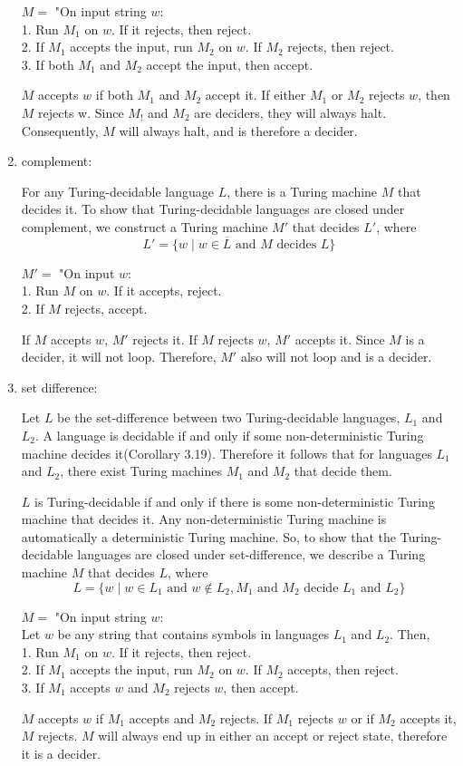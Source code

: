 \documentclass{article}
\begin{document}
\begin{enumerate}[\indent a)]
$M = $ "On input string $w$: 
    \\1. Run $M_1$ on $w$. If it rejects, then reject.
    \\2. If $M_1$ accepts the input, run $M_2$ on $w$. If $M_2$ rejects, then reject.
    \\3. If both $M_1$ and $M_2$ accept the input, then accept.
    
    
    $M$ accepts $w$ if both $M_1$ and $M_2$ accept it. If either $M_1$ or $M_2$ rejects $w$, then $M$ rejects w. Since $M_!$ and $M_2$ are deciders, they will always halt. Consequently, $M$ will always halt, and is therefore a decider.
    
    \item complement:
    
    For any Turing-decidable language $L$, there is a Turing machine $M$ that decides it. To show that Turing-decidable languages are closed under complement, we construct a Turing machine $M'$ that decides $L'$, where
    $$L' = \{w \;|\;  w \in \overline{L} \text{ and $M$ decides $L$}  \}$$
    
    $M' = $ "On input $w$:
    \\1. Run $M$ on $w$. If it accepts, reject.
    \\2. If $M$ rejects, accept.
    
    
    If $M$ accepts $w$, $M'$ rejects it. If $M$ rejects $w$, $M'$ accepts it. Since $M$ is a decider, it will not loop. Therefore, $M'$ also will not loop and is a decider.
    \item set difference:
    
        Let $L$ be the set-difference between two Turing-decidable languages, $L_1$ and $L_2$. A language is decidable if and only if some non-deterministic Turing machine decides it(Corollary 3.19). Therefore it follows that for languages $L_1$ and $L_2$, there exist Turing machines $M_1$ and $M_2$ that decide them.

$L$ is Turing-decidable if and only if there is some non-deterministic Turing machine that decides it. Any non-deterministic Turing machine is automatically a deterministic Turing machine. So, to show that the Turing-decidable languages are closed under set-difference, we describe a Turing machine $M$ that decides $L$, where
$$L = \{w \;|\;  w \in L_1 \text{ and } w\notin L_2, M_1 \text{ and  $M_2$ decide $L_1$ and $L_2$}\}$$

$M = $ "On input string $w$: 
    \\Let $w$ be any string that contains symbols in languages $L_1$ and $L_2$. Then,
    \\1. Run $M_1$ on $w$. If it rejects, then reject.
    \\2. If $M_1$ accepts the input, run $M_2$ on $w$. If $M_2$ accepts, then reject.
    \\3. If $M_1$ accepts $w$ and $M_2$ rejects $w$, then accept.
    
    
$M$ accepts $w$ if $M_1$ accepts and $M_2$ rejects. If $M_1$ rejects $w$ or if $M_2$ accepts it, $M$ rejects. $M$ will always end up in either an accept or reject state, therefore it is a decider.

\end{enumerate} 
\end{document}
